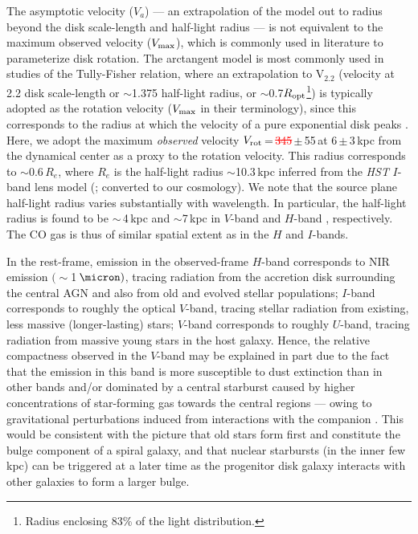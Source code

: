 \documentclass[]{emulateapj}
\newcommand{\new}[1]{\textcolor{blue}{\uwave{#1}}}
\newcommand{\old}[1]{\textcolor{red}{\st{#1}}} %
\begin{document}
The asymptotic velocity ($V_{a}$) --- an extrapolation of the model
out to radius beyond the disk scale-length and half-light radius ---
is not equivalent to the maximum observed velocity ($V_{\rm max}$),
which is commonly used in literature to parameterize disk rotation.
The arctangent model is most commonly used in studies of the
Tully-Fisher relation, where an extrapolation to V$_{2.2}$ (velocity
at 2.2 disk scale-length or $\sim$1.375 half-light radius,
or $\sim$0.7$R_{\rm opt}$\footnote{Radius enclosing 83\% of the light
distribution.}) is typically adopted
as the rotation velocity ($V_{\rm max}$ in their
terminology), since this corresponds to the radius at which the velocity
of a pure exponential disk peaks \citep{Courteau97b}.
Here, we adopt the maximum {\em observed} velocity
$V_{\rm rot}$\,=\,\old{345}\new{303}\,$\pm$\,55\,\kms at 6\,$\pm$\,3\,kpc from the
dynamical center as a proxy to the rotation velocity.
This radius corresponds to $\sim$0.6\,$R_e$, where $R_e$ is the half-light
radius $\sim$10.3\,kpc inferred from the {\it HST} $I$-band
lens model (; converted to
our cosmology).
We note that the source plane half-light radius varies substantially with
wavelength. In particular, the half-light radius is found to be
$\sim$\,4\,kpc and $\sim$7\,kpc in $V$-band
 and $H$-band , respectively.
The CO gas is thus of similar spatial
extent as in the $H$ and $I$-bands.

In the rest-frame,
emission in the observed-frame $H$-band corresponds to NIR emission $(\sim$1\,$\micron)$,
tracing radiation from the accretion disk surrounding
the central AGN and also from old and evolved stellar populations;
$I$-band corresponds to roughly the optical $V$-band, tracing stellar radiation from
existing, less massive (\ie longer-lasting) stars;
$V$-band corresponds to roughly $U$-band,  tracing radiation from massive young stars
in the host galaxy. Hence,
the relative compactness observed in the $V$-band may be explained in part
due to the fact that the emission in this band is
more susceptible to dust extinction than in other bands and/or dominated by
a central starburst caused by higher
concentrations of star-forming gas towards the central regions --- owing to
gravitational perturbations induced
from interactions with the companion
\citep[\eg][]{DiMatteo05a}.
This would be consistent with the picture that old stars form first and constitute the bulge component
of a spiral galaxy, and that nuclear starbursts (in the inner few kpc) can be triggered
at a later time as the progenitor disk galaxy interacts with other galaxies to form a larger bulge.
\end{document}
